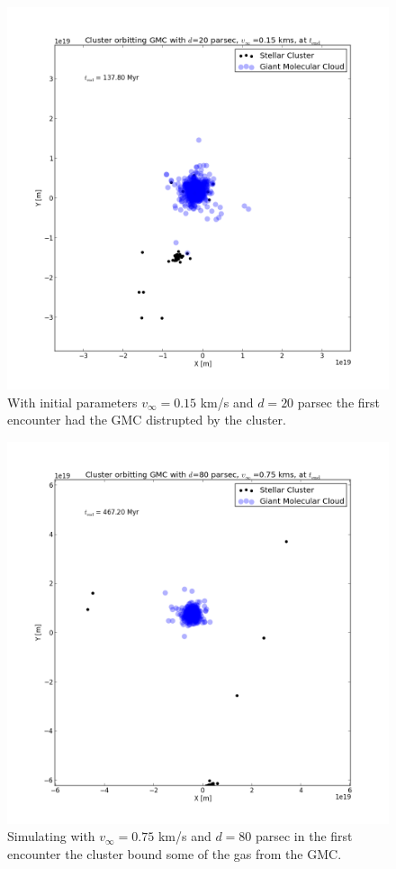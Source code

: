 \documentclass{aa}
\begin{document}
\begin{figure}[h!]
    \centering
    \includegraphics[width=\hsize]{img/v_15_d_20_second_encounter.png}
    \caption{With initial parameters $v_\infty = 0.15$ km/s and $d = 20$ parsec the first encounter had the GMC distrupted by the cluster.}\label{fig:v_15_d_20_sec}
\end{figure}
\begin{figure}[h!]
    \centering
    \includegraphics[width=\hsize]{img/v_75_d_80_second_encounter.png}
    \caption{Simulating with $v_\infty = 0.75$ km/s and $d = 80$ parsec in the first encounter the cluster bound some of the gas from the GMC.}\label{fig:v_75_d_80_sec}
\end{figure}
\end{document}
